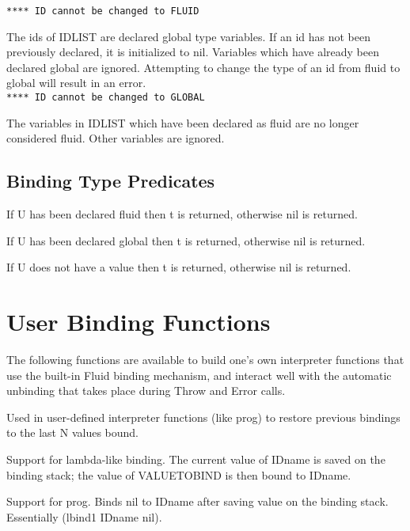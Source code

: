     {\tt***** ID cannot be changed to FLUID}

{    The ids of IDLIST are declared global type variables.  If an
    id  has  not  been previously declared, it is initialized to
    nil.  Variables which have already been declared global  are
    ignored.   Attempting to change the type of an id from fluid
    to global will result in an error.\\

    {\tt***** ID cannot be changed to GLOBAL}
}

{    The variables in IDLIST which have been  declared  as  fluid
    are  no  longer  considered  fluid.    Other  variables  are
    ignored.
}
\subsection{Binding Type Predicates}

{    If U has been declared fluid then t is  returned,  otherwise
    nil is returned.
}

{    If  U has been declared global then t is returned, otherwise
    nil is returned.
}

{    If U does not have a value then t is returned, otherwise nil
    is returned.
}
\section{User Binding Functions}

  The following functions  are  available  to  build  one's  own
interpreter  functions  that  use  the  built-in  Fluid  binding
mechanism, and interact well with the automatic  unbinding  that
takes place during  Throw and Error calls.


{    Used  in  user-defined  interpreter functions (like prog) to
    restore previous bindings to the last N values bound.
}

{   	Support for lambda-like  binding.    The  current  value  of
    IDname   is  saved  on  the  binding  stack;  the  value  of
    VALUETOBIND is then bound to IDname.
}

{   	Support for prog.  Binds nil to IDname after saving value on
    the binding stack.  Essentially (lbind1 IDname nil).
}

